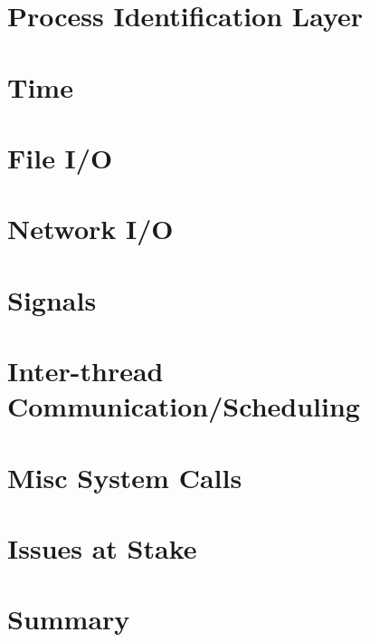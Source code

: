 \section{Process Identification Layer} \label{ch3:pid}

\section{Time} \label{ch3:time}

\section{File I/O}

\section{Network I/O}

\section{Signals}

\section{Inter-thread Communication/Scheduling} 

\section{Misc System Calls}


\section{Issues at Stake}
\section {Summary}
